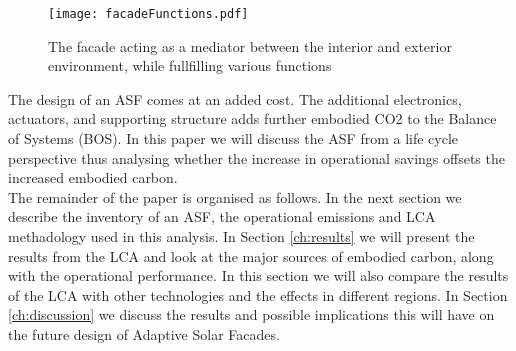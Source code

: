 \begin{figure}[H]
\begin{center}
\texttt{[image: facadeFunctions.pdf]}
\caption{The facade acting as a mediator between the interior and exterior environment, while fullfilling various functions \cite{nagy2015frontiers}}
\label{fig:ASFschematic}
\end{center}
\end{figure}

The design of an ASF comes at an added cost. The additional electronics, actuators, and supporting structure adds further embodied CO2 to the Balance of Systems (BOS). In this paper we will discuss the ASF from a life cycle perspective thus analysing whether the increase in operational savings offsets the increased embodied carbon. \\
The remainder of the paper is organised as follows. In the next section we describe the inventory of an ASF, the operational emissions and LCA methadology used in this analysis. In Section \ref{ch:results} we will present the results from the LCA and look at the major sources of embodied carbon, along with the operational performance. In this section we will also compare the results of the LCA with other technologies and the effects in different regions. In Section \ref{ch:discussion} we discuss the results and possible implications this will have on the future design of Adaptive Solar Facades. 















